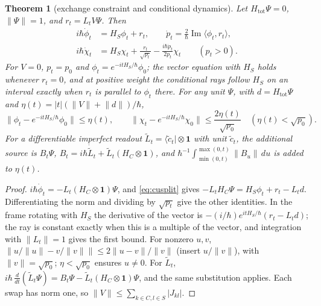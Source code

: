 \documentclass[aps,pra,onecolumn,superscriptaddress,nofootinbib,10pt]{revtex4-2}
\newtheorem{theorem}{Theorem}
\theoremstyle{definition}
\theoremstyle{remark}
\newcommand{\im}{\operatorname{Im}}
\newcommand{\ip}[2]{\langle #1,#2\rangle}
\begin{document}
\begin{theorem}[exchange constraint and conditional dynamics]\label{thm:cucond}
Let $H_{\mathrm{tot}}\Psi=0$, $\lVert\Psi\rVert=1$, and $r_t=L_tV\Psi$.  Then
\begin{align}
i\hbar\dot\phi_t&=H_S\phi_t+r_t,\qquad \dot p_t=\tfrac2\hbar\im\ip{\phi_t}{r_t},\label{eq:cusource}\\
i\hbar\dot\chi_t&=H_S\chi_t+\frac{r_t}{\sqrt{p_t}}-\frac{i\hbar\dot p_t}{2p_t}\chi_t\qquad(p_t>0).\label{eq:cunormalized}
\end{align}
For $V=0$, $p_t=p_0$ and $\phi_t=e^{-itH_S/\hbar}\phi_0$; the vector equation with $H_S$ holds whenever $r_t=0$, and at positive
weight the conditional rays follow $H_S$ on an interval exactly when $r_t$ is parallel to $\phi_t$ there.  For any
unit $\Psi$, with $d=H_{\mathrm{tot}}\Psi$ and $\eta(t)=\lvert t\rvert(\lVert V\rVert+\lVert d\rVert)/\hbar$,
\begin{equation}\label{eq:cuerr}
\lVert\phi_t-e^{-itH_S/\hbar}\phi_0\rVert\le\eta(t),\qquad
\lVert\chi_t-e^{-itH_S/\hbar}\chi_0\rVert\le\frac{2\eta(t)}{\sqrt{p_0}}\quad(\eta(t)<\sqrt{p_0}).
\end{equation}
For a differentiable imperfect readout $\widetilde L_t=\langle\tilde c_t\rvert\otimes\mathbf1$ with unit $\tilde c_t$, the additional source is $B_t\Psi$,
$B_t=i\hbar\dot{\widetilde L}_t+\widetilde L_t(H_C\otimes\mathbf1)$, and $\hbar^{-1}\int_{\min(0,t)}^{\max(0,t)}\lVert B_u\rVert\,du$ is added to $\eta(t)$.
\end{theorem}
\begin{proof}
$i\hbar\dot\phi_t=-L_t(H_C\otimes\mathbf1)\Psi$, and \eqref{eq:cusplit} gives $-L_tH_C\Psi=H_S\phi_t+r_t-L_td$.  Differentiating the norm and
dividing by $\sqrt{p_t}$ give the other identities.  In the frame rotating with $H_S$ the derivative of the vector is
$-(i/\hbar)e^{itH_S/\hbar}(r_t-L_td)$; the ray is constant exactly when this is a multiple of the vector, and integration
with $\lVert L_t\rVert=1$ gives the first bound.  For nonzero $u,v$, $\lVert u/\lVert u\rVert-v/\lVert v\rVert\rVert\le2\lVert u-v\rVert/\lVert v\rVert$ (insert $u/\lVert v\rVert$), with
$\lVert v\rVert=\sqrt{p_0}$; $\eta<\sqrt{p_0}$ ensures $u\ne0$.  For $\widetilde L_t$, $i\hbar\,\tfrac{d}{dt}(\widetilde L_t\Psi)=B_t\Psi-\widetilde L_t(H_C\otimes\mathbf1)\Psi$, and the same
substitution applies.  Each swap has norm one, so $\lVert V\rVert\le\sum_{k\in C,l\in S}\lvert J_{kl}\rvert$.
\end{proof}
\end{document}
